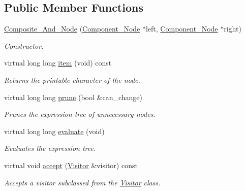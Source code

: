 \subsection*{Public Member Functions}
\begin{DoxyCompactItemize}
\item 
\hyperlink{classMadara_1_1Expression__Tree_1_1Composite__And__Node_a2a11332ddd4ade2d26fbbd2de800173b}{Composite\_\-And\_\-Node} (\hyperlink{classMadara_1_1Expression__Tree_1_1Component__Node}{Component\_\-Node} $\ast$left, \hyperlink{classMadara_1_1Expression__Tree_1_1Component__Node}{Component\_\-Node} $\ast$right)
\begin{DoxyCompactList}\small\item\em Constructor. \item\end{DoxyCompactList}\item 
virtual long long \hyperlink{classMadara_1_1Expression__Tree_1_1Composite__And__Node_a69165571334e1ed1446c3a2e795930de}{item} (void) const 
\begin{DoxyCompactList}\small\item\em Returns the printable character of the node. \item\end{DoxyCompactList}\item 
virtual long long \hyperlink{classMadara_1_1Expression__Tree_1_1Composite__And__Node_aebd287766ca5e720db29446b60c1b9b6}{prune} (bool \&can\_\-change)
\begin{DoxyCompactList}\small\item\em Prunes the expression tree of unnecessary nodes. \item\end{DoxyCompactList}\item 
virtual long long \hyperlink{classMadara_1_1Expression__Tree_1_1Composite__And__Node_a4d7510e8174d0f3d666d707808237859}{evaluate} (void)
\begin{DoxyCompactList}\small\item\em Evaluates the expression tree. \item\end{DoxyCompactList}\item 
virtual void \hyperlink{classMadara_1_1Expression__Tree_1_1Composite__And__Node_a7bfbeebb5c90625a79ec0cb19e17c118}{accept} (\hyperlink{classMadara_1_1Expression__Tree_1_1Visitor}{Visitor} \&visitor) const 
\begin{DoxyCompactList}\small\item\em Accepts a visitor subclassed from the \hyperlink{classMadara_1_1Expression__Tree_1_1Visitor}{Visitor} class. \item\end{DoxyCompactList}\item 

\end{DoxyCompactItemize}
